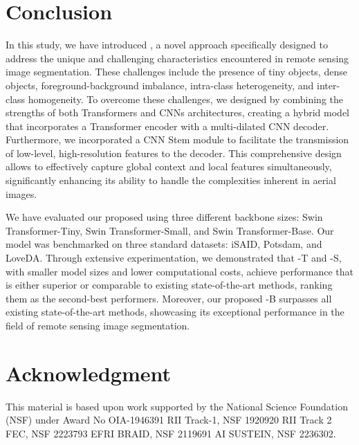 \documentclass[journal]{IEEEtran}
\begin{document}
\section{Conclusion}
In this study, we have introduced \model, a novel approach specifically designed to address the unique and challenging characteristics encountered in remote sensing image segmentation. These challenges include the presence of tiny objects, dense objects, foreground-background imbalance, intra-class heterogeneity, and inter-class homogeneity. To overcome these challenges, we designed \model by combining the strengths of both Transformers and CNNs architectures, creating a hybrid model that incorporates a Transformer encoder with a multi-dilated CNN decoder. Furthermore, we incorporated a CNN Stem module to facilitate the transmission of low-level, high-resolution features to the decoder. This comprehensive design allows \model to effectively capture global context and local features simultaneously, significantly enhancing its ability to handle the complexities inherent in aerial images.

We have evaluated our proposed \model using three different backbone sizes: Swin Transformer-Tiny, Swin Transformer-Small, and Swin Transformer-Base. Our model was benchmarked on three standard datasets: iSAID, Potsdam, and LoveDA. Through extensive experimentation, we demonstrated that \model-T and \model-S, with smaller model sizes and lower computational costs, achieve performance that is either superior or comparable to existing state-of-the-art methods, ranking them as the second-best performers. Moreover, our proposed \model-B surpasses all existing state-of-the-art methods, showcasing its exceptional performance in the field of remote sensing image segmentation.

\section*{Acknowledgment}
This material is based upon work supported by the National Science Foundation (NSF) under Award No OIA-1946391 RII Track-1, NSF 1920920 RII Track 2 FEC, NSF 2223793 EFRI BRAID, NSF 2119691 AI SUSTEIN, NSF 2236302.

\newpage




\end{document}
